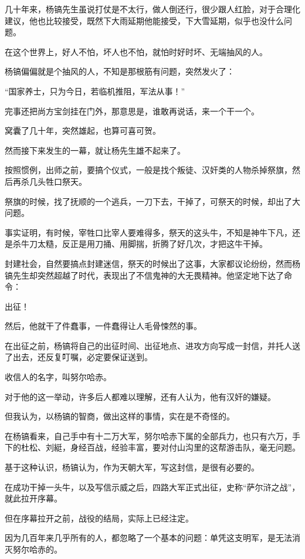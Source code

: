 \begin{multicols}{\theparacolNo}
		几十年来，杨镐先生虽说打仗是不太行，做人倒还行，很少跟人红脸，对于合理化建议，他也比较接受，既然下大雨延期他能接受，下大雪延期，似乎也没什么问题。

		在这个世界上，好人不怕，坏人也不怕，就怕时好时坏、无端抽风的人。

		杨镐偏偏就是个抽风的人，不知是那根筋有问题，突然发火了：

		“国家养士，只为今日，若临机推阻，军法从事！”

		完事还把尚方宝剑挂在门外，那意思是，谁敢再说话，来一个干一个。

		窝囊了几十年，突然雄起，也算可喜可贺。

		然而接下来发生的一幕，就让杨先生雄不起来了。

		按照惯例，出师之前，要搞个仪式，一般是找个叛徒、汉奸类的人物杀掉祭旗，然后再杀几头牲口祭天。

		祭旗的时候，找了抚顺的一个逃兵，一刀下去，干掉了，可祭天的时候，却出了大问题。

		事实证明，有时候，宰牲口比宰人要难得多，祭天的这头牛，不知是神牛下凡，还是杀牛刀太糙，反正是用刀捅、用脚揣，折腾了好几次，才把这牛干掉。

		封建社会，自然要搞点封建迷信，祭天的时候出了这事，大家都议论纷纷，然而杨镐先生却突然超越了时代，表现出了不信鬼神的大无畏精神。他坚定地下达了命令：

		出征！

		然后，他就干了件蠢事，一件蠢得让人毛骨悚然的事。

		在出征之前，杨镐将自己的出征时间、出征地点、进攻方向写成一封信，并托人送了出去，还反复叮嘱，必定要保证送到。

		收信人的名字，叫努尔哈赤。

		对于他的这一举动，许多后人都难以理解，还有人认为，他有汉奸的嫌疑。

		但我认为，以杨镐的智商，做出这样的事情，实在是不奇怪的。

		在杨镐看来，自己手中有十二万大军，努尔哈赤下属的全部兵力，也只有六万，手下的杜松、刘綎，身经百战，经验丰富，要对付山沟里的这帮游击队，毫无问题。

		基于这种认识，杨镐认为，作为天朝大军，写这封信，是很有必要的。

		在成功干掉一头牛，以及写信示威之后，四路大军正式出征，史称“萨尔浒之战”，就此拉开序幕。

		但在序幕拉开之前，战役的结局，实际上已经注定。

		因为几百年来几乎所有的人，都忽略了一个基本的问题：单凭这支明军，是无法消灭努尔哈赤的。


\end{multicols}

